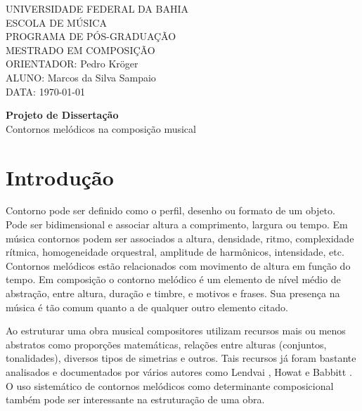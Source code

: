 \documentclass{article}
\begin{document}
\setlength{\parindent}{0cm}

\large
UNIVERSIDADE FEDERAL DA BAHIA \\
ESCOLA DE MÚSICA \\
PROGRAMA DE PÓS-GRADUAÇÃO \\
MESTRADO EM COMPOSIÇÃO \\
ORIENTADOR: Pedro Kröger \\
ALUNO: Marcos da Silva Sampaio \\
DATA: \today

\thispagestyle{empty}
\vspace{1cm}
\begin{center}{
    \Huge \textbf{Projeto de Dissertação} \\
}
\vspace{12pt}
{\Large Contornos melódicos na composição musical}

\end{center}
\vspace{1cm}

\section{Introdução}
\label{sec:introducao}

Contorno pode ser definido como o perfil, desenho ou formato de um
objeto. Pode ser bidimensional e associar altura a comprimento,
largura ou tempo. Em música contornos podem ser associados a altura,
densidade, ritmo, complexidade rítmica, homogeneidade orquestral,
amplitude de harmônicos, intensidade, etc. Contornos melódicos estão
relacionados com movimento de altura em função do tempo.
Em composição o contorno melódico é um elemento de nível médio de
abstração, entre altura, duração e timbre, e motivos e frases. Sua
presença na música é tão comum quanto a de qualquer outro elemento
citado. 


Ao estruturar uma obra musical compositores utilizam recursos mais ou
menos abstratos como proporções matemáticas, relações entre alturas
(conjuntos, tonalidades), diversos tipos de simetrias e outros. Tais
recursos já foram bastante analisados e documentados por vários
autores como Lendvai \cite{Lendvai1971}, Howat \cite{Howat1983} e
Babbitt \cite{babbitt1961ssc}. O uso sistemático de contornos
melódicos como determinante composicional também pode ser interessante
na estruturação de uma obra.
\end{document}
